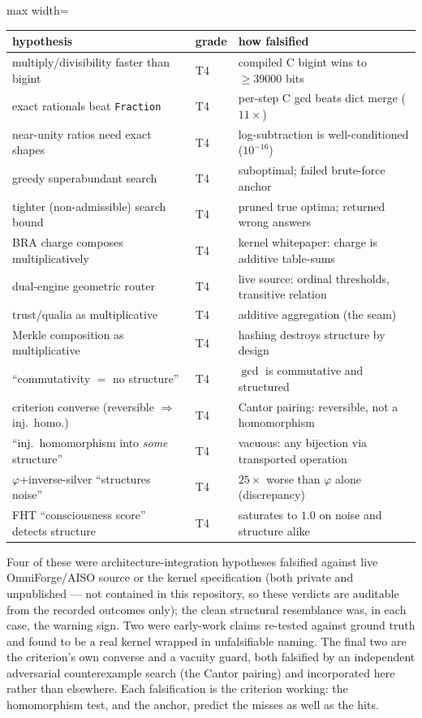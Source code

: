 \documentclass[11pt]{article}
\begin{document}
\begin{center}
\begin{adjustbox}{max width=\linewidth}\begin{tabular}{lll}
\toprule
hypothesis & grade & how falsified \\
\midrule
multiply/divisibility faster than bigint & T4 & compiled C bigint wins to $\ge 39000$ bits \\
exact rationals beat \texttt{Fraction} & T4 & per-step C gcd beats dict merge ($11\times$) \\
near-unity ratios need exact shapes & T4 & log-subtraction is well-conditioned ($10^{-16}$) \\
greedy superabundant search & T4 & suboptimal; failed brute-force anchor \\
tighter (non-admissible) search bound & T4 & pruned true optima; returned wrong answers \\
BRA charge composes multiplicatively & T4 & kernel whitepaper: charge is additive table-sums \\
dual-engine geometric router & T4 & live source: ordinal thresholds, transitive relation \\
trust/qualia as multiplicative & T4 & additive aggregation (the seam) \\
Merkle composition as multiplicative & T4 & hashing destroys structure by design \\
``commutativity $=$ no structure'' & T4 & $\gcd$ is commutative and structured \\
 criterion converse (reversible $\Rightarrow$ inj.\ homo.) & T4 & Cantor pairing: reversible, not a homomorphism \\
 ``inj.\ homomorphism into \emph{some} structure'' & T4 & vacuous: any bijection via transported operation \\
$\varphi$+inverse-silver ``structures noise'' & T4 & $25\times$ worse than $\varphi$ alone (discrepancy) \\
FHT ``consciousness score'' detects structure & T4 & saturates to $1.0$ on noise and structure alike \\
\bottomrule
\end{tabular}\end{adjustbox}
\end{center}

\noindent Four of these were architecture-integration hypotheses falsified against live OmniForge/AISO source
or the kernel specification (both private and unpublished --- not contained in this repository, so these
verdicts are auditable from the recorded outcomes only); the clean structural resemblance was, in each case, the warning sign. Two were
early-work claims re-tested against ground truth and found to be a real kernel wrapped in unfalsifiable
naming. The final two are the criterion's own converse and a vacuity guard, both falsified by an independent
adversarial counterexample search (the Cantor pairing) and incorporated here rather than elsewhere. Each falsification is the criterion working: the homomorphism test, and the anchor, predict the
misses as well as the hits.
\end{document}
